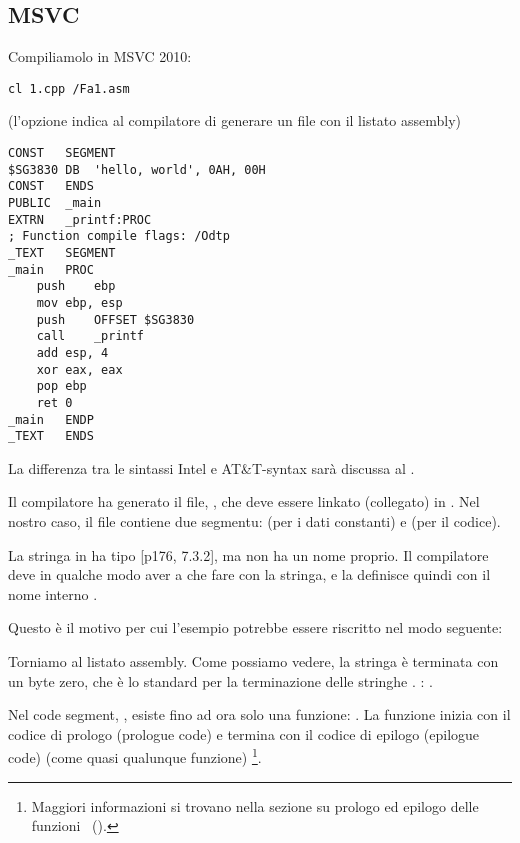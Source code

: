 \subsection{MSVC}

Compiliamolo in MSVC 2010:

\begin{lstlisting}
cl 1.cpp /Fa1.asm
\end{lstlisting}

(l'opzione  indica al compilatore di generare un file con il listato assembly)

\begin{lstlisting}[caption=MSVC 2010]
CONST	SEGMENT
$SG3830	DB	'hello, world', 0AH, 00H
CONST	ENDS
PUBLIC	_main
EXTRN	_printf:PROC
; Function compile flags: /Odtp
_TEXT	SEGMENT
_main	PROC
	push	ebp
	mov	ebp, esp
	push	OFFSET $SG3830
	call	_printf
	add	esp, 4
	xor	eax, eax
	pop	ebp
	ret	0
_main	ENDP
_TEXT	ENDS
\end{lstlisting}

\ITAph{}
La differenza tra le sintassi Intel e AT\&T-syntax sarà discussa al .

Il compilatore ha generato il file, , che deve essere linkato (collegato) in .
Nel nostro caso, il file contiene due segmentu:  (per i dati constanti) e  (per il codice).

\label{string_is_const_char}
La stringa  in \CCpp ha tipo [\TCPPPL p176, 7.3.2], ma non ha un nome proprio.
Il compilatore deve in qualche modo aver a che fare con la stringa, e la definisce quindi con il nome interno .

Questo è il motivo per cui l'esempio potrebbe essere riscritto nel modo seguente:



Torniamo al listato assembly. Come possiamo vedere, la stringa è terminata con un byte zero, che è lo standard per la terminazione delle stringhe \CCpp.
\ITAph{}: .

Nel code segment, , esiste fino ad ora solo una funzione: \main{}.
La funzione \main inizia con il codice di prologo (prologue code) e termina con il codice di epilogo (epilogue code) (come quasi qualunque funzione)
\footnote{Maggiori informazioni si trovano nella sezione su prologo ed epilogo delle funzioni ~().}.

